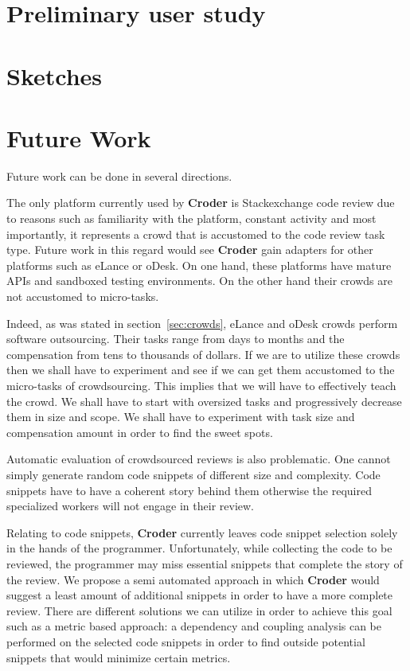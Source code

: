 \documentclass{sigchi}
\newcommand{\croder}{\textbf{Croder }}
\begin{document}
\section{Preliminary user study}
\section{Sketches}

\section{Future Work}
\label{sec:future}

Future work can be done in several directions.

The only platform currently used by \croder is Stackexchange code review due to reasons such as familiarity with the platform, constant activity and most importantly, it represents a crowd that is accustomed to the code review task type.
Future work in this regard would see \croder gain adapters for other platforms such as eLance or oDesk. On one hand, these platforms have mature APIs and sandboxed testing environments. On the other hand their crowds are not accustomed to micro-tasks.

Indeed, as was stated in section~\ref{sec:crowds}, eLance and oDesk crowds perform software outsourcing. Their tasks range from days to months and the compensation from tens to thousands of dollars. If we are to utilize these crowds then we shall have to experiment and see if we can get them accustomed to the micro-tasks of crowdsourcing. This implies that we will have to effectively teach the crowd. We shall have to start with oversized tasks and progressively decrease them in size and scope. We shall have to experiment with task size and compensation amount in order to find the sweet spots.

Automatic evaluation of crowdsourced reviews is also problematic. One cannot simply generate random code snippets of different size and complexity. Code snippets have to have a coherent story behind them otherwise the required specialized workers will not engage in their review.

Relating to code snippets, \croder currently leaves code snippet selection solely in the hands of the programmer. Unfortunately, while collecting the code to be reviewed, the programmer may miss essential snippets that complete the story of the review. We propose a semi automated approach in which \croder would suggest a least amount of additional snippets in order to have a more complete review. There are different solutions we can utilize in order to achieve this goal such as a metric based approach: a dependency and coupling analysis can be performed on the selected code snippets in order to find outside potential snippets that would minimize certain metrics.
\end{document}
